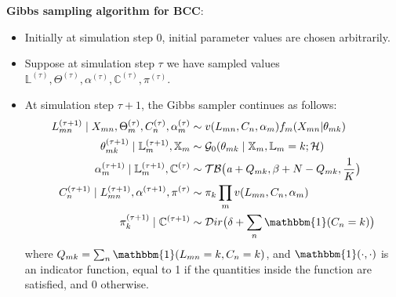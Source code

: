 \noindent\textbf{Gibbs sampling algorithm for BCC}: 
\begin{itemize}
\item {Initially at simulation step 0, initial parameter values are chosen arbitrarily.}
\item {Suppose at simulation step $\tau$ we have sampled values $\mathbb{L}^{(\tau)}, \Theta^{(\tau)}, \alpha^{(\tau)}, \mathbb{C}^{(\tau)}, \pi^{(\tau)}$.}
\item { At simulation step $\tau + 1$, the Gibbs sampler continues as follows:
\begin{equation*}%
  \begin{aligned}
    L_{mn}^{(\tau+1)} \mid X_{mn}, \Theta_{m}^{(\tau)}, C_{n}^{(\tau)}, \alpha_{m}^{(\tau)} & \sim v(L_{mn}, C_{n}, \alpha_{m}) f_{m}(X_{mn}|\theta_{mk}) \\
	\theta_{mk}^{(\tau+1)} \mid \mathbb{L}_{m}^{(\tau+1)}, \mathbb{X}_{m} & \sim \mathcal{G}_{0}(\theta_{mk} \mid \mathbb{X}_{m}, \mathbb{L}_{m} = k; \mathcal{H}) \\
	\alpha_{m}^{(\tau+1)} \mid \mathbb{L}_{m}^{(\tau+1)}, \mathbb{C}^{(\tau)} & \sim \mathcal{TB} \big(\mathit{a} + Q_{mk}, \beta + N - Q_{mk}, \frac{1}{K}\big) \\
	C_{n}^{(\tau+1)} \mid L_{mn}^{(\tau+1)}, \alpha^{(\tau+1)}, \pi^{(\tau)} & \sim \pi_{k} \prod_{m}v(L_{mn}, C_{n}, \alpha_{m}) \\
	\pi_{k}^{(\tau+1)} \mid \mathbb{C}^{(\tau+1)} & \sim \mathcal{D}ir\big(\delta + \sum_{n}\mathbbm{1}(C_{n}=k)\big)
  \end{aligned}
\end{equation*}
where $Q_{mk} = \sum_{n}\mathbbm{1}(L_{mn}=k,C_{n}=k)$, and $\mathbbm{1}(\cdot,\cdot)$ is an indicator function, equal to 1 if the quantities inside the function are satisfied, and 0 otherwise.
}
\end{itemize}
